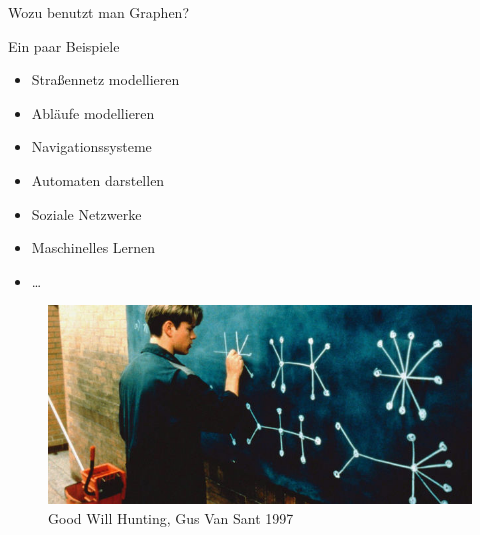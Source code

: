 \documentclass[18pt]{beamer}
\begin{document}
    \begin{frame}[allowframebreaks]{Wozu benutzt man Graphen?}
        \begin{block}{Ein paar Beispiele}
            \begin{itemize}[<+->]
                \item Straßennetz modellieren
                \item Abläufe modellieren
                \item Navigationssysteme
                \item Automaten darstellen
                \item Soziale Netzwerke
                \item Maschinelles Lernen
                \item \dots
            \end{itemize}
        \end{block}
        \begin{figure}[]
            \centering
            \includegraphics[keepaspectratio,width=\textwidth]{logos/GoodWillHunting.jpg}
            \caption{Good Will Hunting, Gus Van Sant 1997}
        \end{figure}
    \end{frame}
\end{document}
